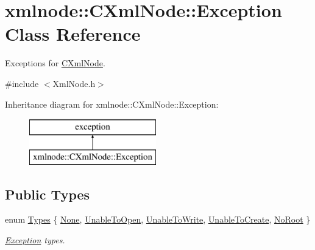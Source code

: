 \hypertarget{classxmlnode_1_1_c_xml_node_1_1_exception}{}\section{xmlnode\+:\+:C\+Xml\+Node\+:\+:Exception Class Reference}
\label{classxmlnode_1_1_c_xml_node_1_1_exception}


Exceptions for \mbox{\hyperlink{classxmlnode_1_1_c_xml_node}{C\+Xml\+Node}}.  




{\ttfamily \#include $<$Xml\+Node.\+h$>$}

Inheritance diagram for xmlnode\+:\+:C\+Xml\+Node\+:\+:Exception\+:\begin{figure}[H]
\begin{center}
\leavevmode
\includegraphics[height=2.000000cm]{classxmlnode_1_1_c_xml_node_1_1_exception}
\end{center}
\end{figure}
\subsection*{Public Types}
\begin{DoxyCompactItemize}
\item 
enum \mbox{\hyperlink{classxmlnode_1_1_c_xml_node_1_1_exception_abdbe07531ef4b19192f1fa2f819ed75f}{Types}} \{ \newline
\mbox{\hyperlink{classxmlnode_1_1_c_xml_node_1_1_exception_abdbe07531ef4b19192f1fa2f819ed75fa22036006e7862ed7f6fc42091f6a3bc8}{None}}, 
\mbox{\hyperlink{classxmlnode_1_1_c_xml_node_1_1_exception_abdbe07531ef4b19192f1fa2f819ed75fa725fdfe67e4fbd5539133a341a5e0a6e}{Unable\+To\+Open}}, 
\mbox{\hyperlink{classxmlnode_1_1_c_xml_node_1_1_exception_abdbe07531ef4b19192f1fa2f819ed75fab4da3fb6cf56910a8302ddb34b697295}{Unable\+To\+Write}}, 
\mbox{\hyperlink{classxmlnode_1_1_c_xml_node_1_1_exception_abdbe07531ef4b19192f1fa2f819ed75fa34828bed7772bc0588f97192c03ea4ad}{Unable\+To\+Create}}, 
\newline
\mbox{\hyperlink{classxmlnode_1_1_c_xml_node_1_1_exception_abdbe07531ef4b19192f1fa2f819ed75fa5e03a8ddc6c8873e07c6a34dc1d7a0e0}{No\+Root}}
 \}
\begin{DoxyCompactList}\small\item\em \mbox{\hyperlink{classxmlnode_1_1_c_xml_node_1_1_exception}{Exception}} types. \end{DoxyCompactList}\end{DoxyCompactItemize}

